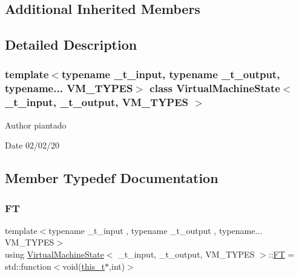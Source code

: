 \subsection*{Additional Inherited Members}


\subsection{Detailed Description}
\subsubsection*{template$<$typename \+\_\+t\+\_\+input, typename \+\_\+t\+\_\+output, typename... V\+M\+\_\+\+T\+Y\+P\+ES$>$\newline
class Virtual\+Machine\+State$<$ \+\_\+t\+\_\+input, \+\_\+t\+\_\+output, V\+M\+\_\+\+T\+Y\+P\+E\+S $>$}

\begin{DoxyAuthor}{Author}
piantado 
\end{DoxyAuthor}
\begin{DoxyDate}{Date}
02/02/20 
\end{DoxyDate}


\subsection{Member Typedef Documentation}
\mbox{\label{class_virtual_machine_state_acacd9869c4a5ff3a765f6bd7d5bae35c}} 
\subsubsection{\texorpdfstring{FT}{FT}}
{\footnotesize\ttfamily template$<$typename \+\_\+t\+\_\+input , typename \+\_\+t\+\_\+output , typename... V\+M\+\_\+\+T\+Y\+P\+ES$>$ \\
using \hyperlink{class_virtual_machine_state}{Virtual\+Machine\+State}$<$ \+\_\+t\+\_\+input, \+\_\+t\+\_\+output, V\+M\+\_\+\+T\+Y\+P\+ES $>$\+::\hyperlink{class_virtual_machine_state_acacd9869c4a5ff3a765f6bd7d5bae35c}{FT} =  std\+::function$<$void(\hyperlink{class_virtual_machine_state_ada0e1bebef2d73581c6adcd55f8be521}{this\+\_\+t}$\ast$,int)$>$}

\mbox{\label{class_virtual_machine_state_a95ba2f54f65b778c8a012ea3e7a0ee50}} 
